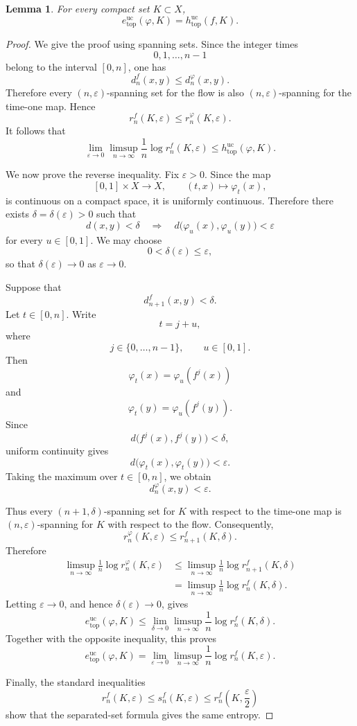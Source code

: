 \documentclass[11pt,reqno]{amsart}
\newtheorem{lemma}[theorem]{Lemma}
\theoremstyle{definition}
\theoremstyle{remark}
\newcommand{\huc}{h^{\mathrm{uc}}_{\mathrm{top}}}
\newcommand{\hE}{e^{\mathrm{uc}}_{\mathrm{top}}}
\begin{document}
\begin{lemma}
\label{l1}
For every compact set $K\subset X$,
\[
\hE(\varphi,K)
=
\huc(f,K).
\]
\end{lemma}

\begin{proof}
We give the proof using spanning sets.
Since the integer times
\[
0,1,\ldots,n-1
\]
belong to the interval $[0,n]$, one has
\[
d_n^f(x,y)\leq d_n^\varphi(x,y).
\]
Therefore every $(n,\varepsilon)$-spanning set for the flow is also
$(n,\varepsilon)$-spanning for the time-one map. Hence
\[
r_n^f(K,\varepsilon)
\leq
r_n^\varphi(K,\varepsilon).
\]
It follows that
\[
\lim_{\varepsilon\to0}
\limsup_{n\to\infty}
\frac1n\log r_n^f(K,\varepsilon)
\leq
\huc(\varphi,K).
\]

We now prove the reverse inequality. Fix $\varepsilon>0$. Since the
map
\[
[0,1]\times X\longrightarrow X,
\qquad
(t,x)\longmapsto\varphi_t(x),
\]
is continuous on a compact space, it is uniformly continuous.
Therefore there exists $\delta=\delta(\varepsilon)>0$ such that
\[
d(x,y)<\delta
\quad\Longrightarrow\quad
d\bigl(\varphi_u(x),\varphi_u(y)\bigr)<\varepsilon
\]
for every $u\in[0,1]$. We may choose
\[
0<\delta(\varepsilon)\leq\varepsilon,
\]
so that $\delta(\varepsilon)\to0$ as $\varepsilon\to0$.

Suppose that
\[
d_{n+1}^f(x,y)<\delta.
\]
Let $t\in[0,n]$. Write
\[
t=j+u,
\]
where
\[
j\in\{0,\ldots,n-1\},
\qquad
u\in[0,1].
\]
Then
\[
\varphi_t(x)=\varphi_u(f^j(x))
\]
and
\[
\varphi_t(y)=\varphi_u(f^j(y)).
\]
Since
\[
d\bigl(f^j(x),f^j(y)\bigr)<\delta,
\]
uniform continuity gives
\[
d\bigl(\varphi_t(x),\varphi_t(y)\bigr)<\varepsilon.
\]
Taking the maximum over $t\in[0,n]$, we obtain
\[
d_n^\varphi(x,y)<\varepsilon.
\]

Thus every $(n+1,\delta)$-spanning set for $K$ with respect to the
time-one map is $(n,\varepsilon)$-spanning for $K$ with respect to the
flow. Consequently,
\[
r_n^\varphi(K,\varepsilon)
\leq
r_{n+1}^f(K,\delta).
\]
Therefore
\[
\begin{aligned}
\limsup_{n\to\infty}
\frac1n\log r_n^\varphi(K,\varepsilon)
&\leq
\limsup_{n\to\infty}
\frac1n\log r_{n+1}^f(K,\delta)\\
&=
\limsup_{n\to\infty}
\frac1n\log r_n^f(K,\delta).
\end{aligned}
\]
Letting $\varepsilon\to0$, and hence
$\delta(\varepsilon)\to0$, gives
\[
\hE(\varphi,K)
\leq
\lim_{\delta\to0}
\limsup_{n\to\infty}
\frac1n\log r_n^f(K,\delta).
\]
Together with the opposite inequality, this proves
\[
\hE(\varphi,K)
=
\lim_{\varepsilon\to0}
\limsup_{n\to\infty}
\frac1n\log r_n^f(K,\varepsilon).
\]

Finally, the standard inequalities
\[
r_n^f(K,\varepsilon)
\leq
s_n^f(K,\varepsilon)
\leq
r_n^f\left(K,\frac{\varepsilon}{2}\right)
\]
show that the separated-set formula gives the same entropy.
\end{proof}
\end{document}
